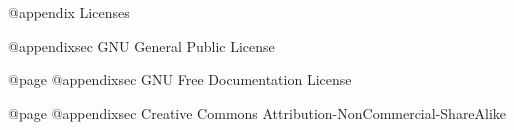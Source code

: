 @appendix Licenses

@appendixsec GNU General Public License


@page
@appendixsec GNU Free Documentation License


@page
@appendixsec Creative Commons Attribution-NonCommercial-ShareAlike



